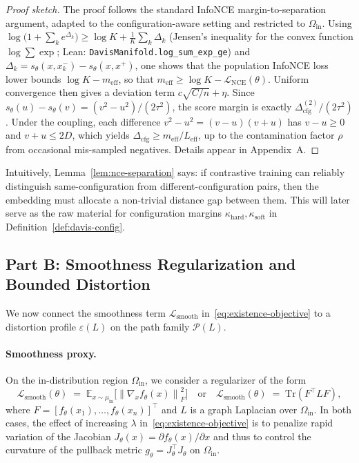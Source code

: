 \documentclass[11pt]{article}
\newcommand{\E}{\mathbb{E}}
\newcommand{\norm}[1]{\left\lVert #1 \right\rVert}
\theoremstyle{remark}
\theoremstyle{plain}
\begin{document}
\begin{proof}[Proof sketch]
The proof follows the standard InfoNCE margin-to-separation argument, adapted to the
configuration-aware setting and restricted to $\Omega_{\mathrm{in}}$. Using
$\log\bigl(1 + \sum_k e^{\Delta_k}\bigr) \ge \log K + \tfrac{1}{K}\sum_k \Delta_k$ (Jensen's inequality for
the convex function $\log\sum\exp$; Lean: \texttt{DavisManifold.log\_sum\_exp\_ge}) and
$\Delta_k = s_\theta(x,x^-_k) - s_\theta(x,x^+)$, one shows that the population InfoNCE loss lower
bounds $\log K - m_{\mathrm{eff}}$, so that
$m_{\mathrm{eff}} \ge \log K - \mathcal{L}_{\mathrm{NCE}}(\theta)$. Uniform convergence then gives
a deviation term $c\sqrt{C/n} + \eta$. Since $s_\theta(u) - s_\theta(v) = (v^2 - u^2)/(2\tau^2)$, the score
margin is exactly $\Delta^{(2)}_{\mathrm{cfg}}/(2\tau^2)$. Under the coupling, each difference
$v^2 - u^2 = (v-u)(v+u)$ has $v - u \ge 0$ and $v + u \le 2D$, which yields
$\Delta_{\mathrm{cfg}} \ge m_{\mathrm{eff}} / L_{\mathrm{eff}}$, up to the contamination factor $\rho$
from occasional mis-sampled negatives. Details appear in Appendix~A.
\end{proof}

Intuitively, Lemma~\ref{lem:nce-separation} says: if contrastive training can reliably distinguish
same-configuration from different-configuration pairs, then the embedding must allocate a
non-trivial distance gap between them. This will later serve as the raw material for configuration
margins $\kappa_{\mathrm{hard}},\kappa_{\mathrm{soft}}$ in Definition~\ref{def:davis-config}.

\subsection{Part B: Smoothness Regularization and Bounded Distortion}
\label{subsec:existence-smoothness}

We now connect the smoothness term $\mathcal{L}_{\mathrm{smooth}}$ in~\eqref{eq:existence-objective}
to a distortion profile $\varepsilon(L)$ on the path family $\mathcal{P}(L)$.

\paragraph{Smoothness proxy.}
On the in-distribution region $\Omega_{\mathrm{in}}$, we consider a regularizer of the form
\begin{equation}
\label{eq:lsmooth}
\mathcal{L}_{\mathrm{smooth}}(\theta)
\;=\;
\E_{x \sim \mu_{\mathrm{in}}}
\bigl[ \norm{\nabla_x f_\theta(x)}_F^2 \bigr]
\quad\text{or}\quad
\mathcal{L}_{\mathrm{smooth}}(\theta)
\;=\;
\mathrm{Tr}(F^\top L F),
\end{equation}
where $F = [f_\theta(x_1),\dots,f_\theta(x_n)]^\top$ and $L$ is a graph Laplacian over
$\Omega_{\mathrm{in}}$. In both cases, the effect of increasing $\lambda$ in~\eqref{eq:existence-objective}
is to penalize rapid variation of the Jacobian $J_\theta(x) = \partial f_\theta(x) / \partial x$ and
thus to control the curvature of the pullback metric $g_\theta = J_\theta^\top J_\theta$ on
$\Omega_{\mathrm{in}}$.
\end{document}

